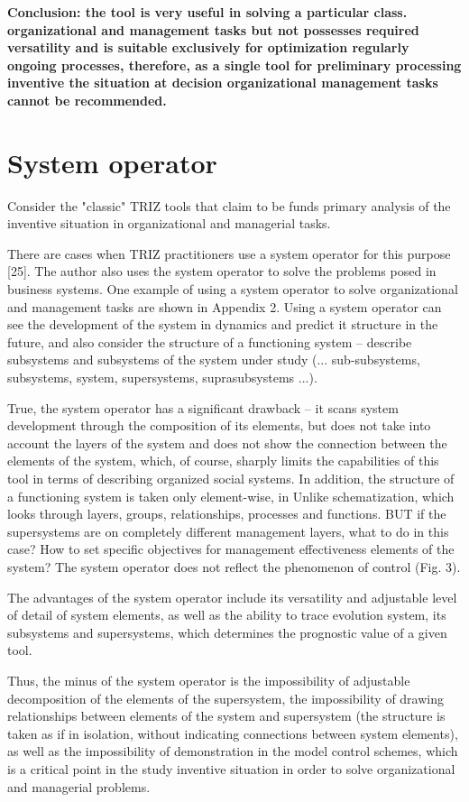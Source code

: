 \textbf{Conclusion: the tool is very useful in solving a particular class.
  organizational and management tasks but not possesses required versatility
  and is suitable exclusively for optimization regularly ongoing processes,
  therefore, as a single tool for preliminary processing inventive the
  situation at decision organizational management tasks cannot be
  recommended.}

\section{System operator}

Consider the "classic" TRIZ tools that claim to be funds primary analysis of
the inventive situation in organizational and managerial tasks.

There are cases when TRIZ practitioners use a system operator for this purpose
[25]. The author also uses the system operator to solve the problems posed in
business systems. One example of using a system operator to solve
organizational and management tasks are shown in Appendix 2. Using a system
operator can see the development of the system in dynamics and predict it
structure in the future, and also consider the structure of a functioning
system -- describe subsystems and subsystems of the system under study
(... sub-subsystems, subsystems, system, supersystems, suprasubsystems ...).

True, the system operator has a significant drawback -- it scans system
development through the composition of its elements, but does not take into
account the layers of the system and does not show the connection between the
elements of the system, which, of course, sharply limits the capabilities of
this tool in terms of describing organized social systems. In addition, the
structure of a functioning system is taken only element-wise, in Unlike
schematization, which looks through layers, groups, relationships, processes
and functions. BUT if the supersystems are on completely different management
layers, what to do in this case? How to set specific objectives for management
effectiveness elements of the system? The system operator does not reflect the
phenomenon of control (Fig. 3).

The advantages of the system operator include its versatility and adjustable
level of detail of system elements, as well as the ability to trace evolution
system, its subsystems and supersystems, which determines the prognostic value
of a given tool.

Thus, the minus of the system operator is the impossibility of adjustable
decomposition of the elements of the supersystem, the impossibility of drawing
relationships between elements of the system and supersystem (the structure is
taken as if in isolation, without indicating connections between system
elements), as well as the impossibility of demonstration in the model control
schemes, which is a critical point in the study inventive situation in order
to solve organizational and managerial problems.

